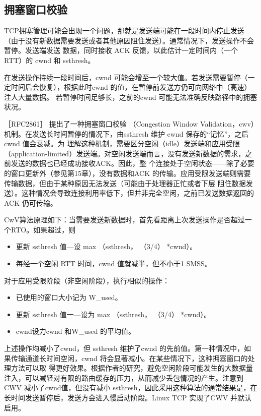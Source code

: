\subsection{拥塞窗口校验}
TCP拥塞管理可能会出现一个问题，那就是发送端可能在一段时间内停止发送（由于没有新数据需要发送或者其他原因阻住发送）。通常情况下，发送操作不会暂停。发送端发送
数据，同时接收 ACK 反馈，以此估计一定时间内（一个 RTT）的 cwnd 和 ssthresh。

在发送操作持续一段时间后，cwnd 可能会增至一个较大值。若发送需要暂停（一定时间后会恢复），根据此时cwnd 的值，在暂停前发送方仍可向网络中（高速）注人大量数据。
若暂停时间足够长，之前的cwnd 可能无法准确反映路径中的拥塞状况。

［RFC2861］ 提出了一种拥塞窗口校验 （Congestion Window Validation，cwv）机制。在发送长时间暂停的情况下，由ssthresh 维护 cwnd 保存的“记忆”，之后cwnd 值会衰减。为
理解这种机制，需要区分空闲（idle）发送端和应用受限（application-limited）发送端。对空闲发送端而言，没有发送新数据的需求，之前发送的数据也已经成功接收ACK。因此，整
个连接处于空闲状态——除了必要的窗口更新外（参见第15章），没有数据和ACK 的传输。应用受限发送端则需要传输数据，但由于某种原因无法发送（可能由于处理器正忙或者下层
阻住数据发送）。这种情况会导致连接利用率低下，但并非完全空闲，之前已发送数据返回的ACK 仍可传输。

CwV算法原理如下：当需要发送新数据时，首先看距离上次发送操作是否超过一个RTO。如果超过，则

\begin{itemize}
    \item 更新 ssthresh 值—设 max （ssthresh， （3/4） *cwnd）。
    \item 每经一个空闲 RTT 时间，cwnd 值就减半，但不小于1 SMSS。
\end{itemize}
对于应用受限阶段（非空闲阶段），执行相似的操作：
\begin{itemize}
    \item 已使用的窗口大小记为 W_used。
    \item 更新 ssthresh 值一—设为 max （ssthresh， （3/4） *cwnd）。
    \item cwnd设力cwnd 和W_used 的平均值。
\end{itemize}

上述操作均减小了cwnd，但 ssthresh 维护了cwnd 的先前值。第一种情况中，如果传输通道长时间空闲，cwnd 将会显著减小。在某些情况下，这种拥塞窗口的处理方法可以取
得更好效果。根据作者的研究，避免空闲阶段可能发生的大数据量注入，可以减轻对有限的路由缓存的压力，从而减少丢包情况的产生。注意到CWV 减小了cwnd值，但没有减小
ssthresh，因此采用这种算法的通常结果是，在长时间发送暂停后，发送方会进入慢启动阶段。Linux TCP 实现了CWV 并默认启用。

